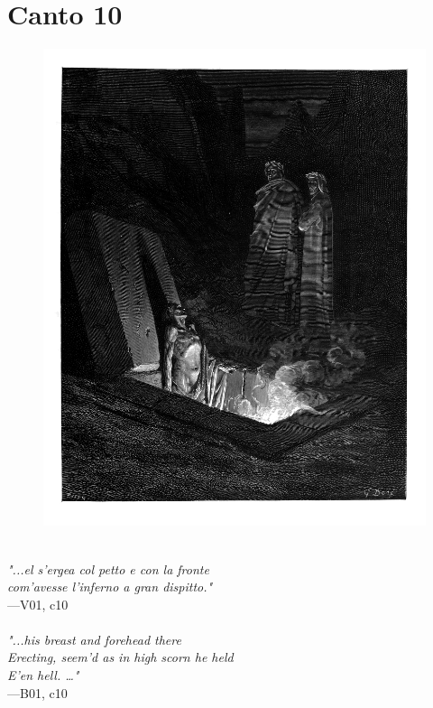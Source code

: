 \documentclass[../Dore_vision.tex]{subfiles}
\begin{document}
\newpage

\section{Canto 10}

\begin{figure}[ht]
\centering
\includegraphics[height=\figsize]{illustrations/book_1/V01, c10.jpg}
\end{figure}

\begin{center}
\begin{minipage}{0.8\linewidth}
\textit{\\
"...el s’ergea col petto e con la fronte\\com’avesse l’inferno a gran dispitto."} \\
—V01, c10 \\~\\
\textit{"...his breast and forehead there\\Erecting, seem'd as in high scorn he held\\E'en hell. …"} \\
—B01, c10
\end{minipage}
\end{center}
\end{document}
